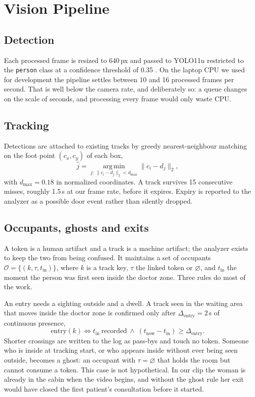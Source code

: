 \documentclass[conference]{IEEEtran}
\begin{document}
\section{Vision Pipeline}
\label{sec:vision}

\subsection{Detection}
Each processed frame is resized to 640\,px and passed to YOLO11n restricted to
the \texttt{person} class at a confidence threshold of 0.35
\cite{ultralytics2024}. On the laptop CPU we used for development the pipeline
settles between 10 and 16 processed frames per second. That is well below the
camera rate, and deliberately so: a queue changes on the scale of seconds, and
processing every frame would only waste CPU.

\subsection{Tracking}
Detections are attached to existing tracks by greedy nearest-neighbour matching
on the foot point $(c_x,c_y)$ of each box,
\begin{equation}
\hat{j} = \operatorname*{arg\,min}_{j:\ \lVert c_i-d_j\rVert_2 < d_{\max}}
\lVert c_i-d_j\rVert_2 ,
\end{equation}
with $d_{\max}=0.18$ in normalized coordinates. A track survives 15 consecutive
misses, roughly 1.5\,s at our frame rate, before it expires. Expiry is reported
to the analyzer as a possible door event rather than silently dropped.

\subsection{Occupants, ghosts and exits}
\label{sec:occupants}
A token is a human artifact and a track is a machine artifact; the analyzer
exists to keep the two from being confused. It maintains a set of occupants
$\mathcal{O}=\{(k,\tau,t_{\mathrm{in}})\}$, where $k$ is a track key, $\tau$ the
linked token or $\varnothing$, and $t_{\mathrm{in}}$ the moment the person was
first seen inside the doctor zone. Three rules do most of the work.

An entry needs a sighting outside and a dwell. A track seen in the waiting area
that moves inside the doctor zone is confirmed only after
$\Delta_{\mathrm{entry}}=2$\,s of continuous presence,
\begin{equation}
\text{entry}(k) \iff t_{\mathrm{in}}\ \text{recorded}\ \wedge\
(t_{\mathrm{now}}-t_{\mathrm{in}}) \ge \Delta_{\mathrm{entry}} .
\end{equation}
Shorter crossings are written to the log as pass-bys and touch no token.
Someone who is inside at tracking start, or who appears inside without ever
being seen outside, becomes a ghost: an occupant with $\tau=\varnothing$ that
holds the room but cannot consume a token. This case is not hypothetical. In
our clip the woman is already in the cabin when the video begins, and without
the ghost rule her exit would have closed the first patient's consultation
before it started.
\end{document}
